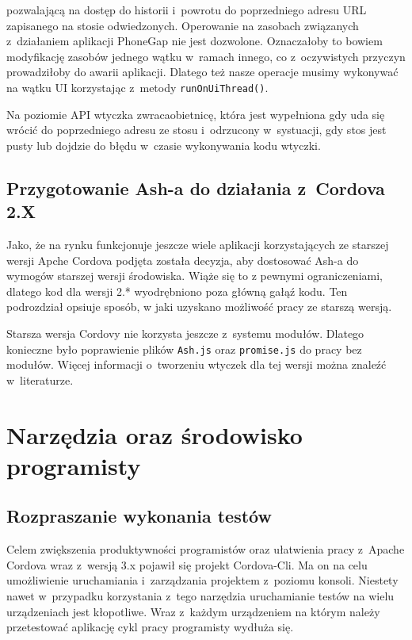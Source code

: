 \documentclass[brudnopis]{xmgr}
\begin{document}
\noindent pozwalającą na dostęp do historii i~powrotu do poprzedniego  adresu URL zapisanego na stosie odwiedzonych. Operowanie na zasobach związanych z~działaniem aplikacji PhoneGap nie jest dozwolone. Oznaczałoby to bowiem modyfikację zasobów jednego wątku w~ramach innego, co z~oczywistych przyczyn prowadziłoby do awarii aplikacji. Dlatego też nasze operacje musimy wykonywać na wątku UI korzystając z~metody \texttt{runOnUiThread()}.

Na poziomie API wtyczka zwracaobietnicę, która jest wypełniona gdy uda się wrócić do poprzedniego adresu ze stosu i~odrzucony w~systuacji, gdy stos jest pusty lub dojdzie do błędu w~czasie wykonywania kodu wtyczki.

\section{Przygotowanie Ash-a do działania z~Cordova 2.X}\label{cordova_2.x}

Jako, że na rynku funkcjonuje jeszcze wiele aplikacji korzystających ze starszej wersji Apche Cordova podjęta została decyzja, aby dostosować Ash-a do wymogów starszej wersji środowiska. Wiąże się to z pewnymi ograniczeniami, dlatego kod dla wersji 2.* wyodrębniono poza główną gałąź kodu. Ten podrozdział opsiuje sposób, w jaki uzyskano możliwość pracy ze starszą wersją. 

Starsza wersja Cordovy nie korzysta jeszcze z~systemu modułów. Dlatego konieczne było poprawienie plików \texttt{Ash.js} oraz \texttt{promise.js} do pracy bez modułów. Więcej informacji o~tworzeniu wtyczek dla tej wersji można znaleźć w~literaturze\cite{Ghatol-Patel}.

\chapter{Narzędzia oraz środowisko programisty}

\section{Rozpraszanie wykonania testów}

Celem zwiększenia produktywności programistów oraz ułatwienia pracy z~Apache Cordova wraz z~wersją 3.x pojawił się projekt Cordova-Cli. Ma on na celu umożliwienie uruchamiania i~zarządzania projektem z~poziomu konsoli. Niestety nawet w~przypadku korzystania z~tego narzędzia uruchamianie testów na wielu urządzeniach jest kłopotliwe. Wraz z~każdym urządzeniem na którym należy przetestować aplikację cykl pracy programisty wydłuża się.
\end{document}
